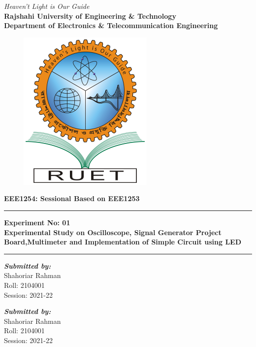 \begin{center}
    \begin{spacing}{2}
        \textit{Heaven't Light is Our Guide}\\
        \textbf{\LARGE{Rajshahi University of Engineering \& Technology}}\\
        \textbf{\Large{Department of Electronics \& Telecommunication Engineering}}
    \end{spacing}
    \begin{figure}[H]
        \centering
        \includegraphics[scale=0.3]{src/logo_ruet.png}
    \end{figure}
    \begin{spacing}{2}
        \textbf{\LARGE{EEE1254: Sessional Based on EEE1253}}
    \end{spacing}
    \rule{\linewidth}{1pt}
    \begin{spacing}{2}
        \textbf{\LARGE{Experiment No: 01}}\\
        \textbf{\Large{Experimental Study on Oscilloscope, Signal Generator Project Board,Multimeter and Implementation of Simple Circuit using LED}}
    \end{spacing}
    \rule{\linewidth}{1pt}
    \noindent %
    \begin{minipage}[t]{0.4\textwidth}

        \begin{flushleft}
            \emph{\textbf{\large Submitted by:}}
            \\
            Shahoriar Rahman \\
            Roll: 2104001 \\
            Session: 2021-22
        \end{flushleft}
    \end{minipage}%
    \hfill
    \begin{minipage}[t]{0.5\textwidth}
        \begin{flushright}
            \emph{\textbf{\large Submitted by:}}
            \\
            Shahoriar Rahman \\
            Roll: 2104001 \\
            Session: 2021-22
        \end{flushright}
    \end{minipage}


\end{center}
